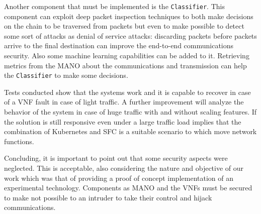 Another component that must be implemented is the \texttt{Classifier}. This
component can exploit deep packet inspection techniques to both make decisions
on the chain to be traversed from packets but even to make possible to
detect some sort of attacks as denial of service attacks: discarding packets
before packets arrive to the final destination can improve the end-to-end
communications security. Also some machine learning capabilities can be added
to it. Retrieving metrics from the MANO about the communications and
transmission can help the \texttt{Classifier} to make some decisions.

Tests conducted show that the systems work and it is capable to recover in case
of a VNF fault in case of light traffic. A further improvement will analyze the
behavior of the system in case of huge traffic with and without scaling
features. If the solution is still responsive even under a large traffic load
implies that the combination of Kubernetes and SFC is a suitable scenario to
which move network functions.

Concluding, it is important to point out that some security aspects were
neglected. This is acceptable, also considering the nature and objective of our
work which was that of providing a proof of concept implementation of an
experimental technology. Components as MANO and the VNFs must be secured to
make not possible to an intruder to take their control and hijack
communications.